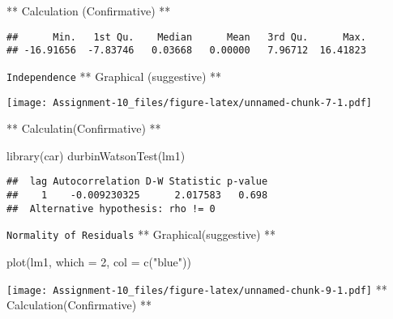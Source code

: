 \documentclass[
]{article}
\newenvironment{Shaded}{\begin{snugshade}}{\end{snugshade}}
\newcommand{\AttributeTok}[1]{\textcolor[rgb]{0.77,0.63,0.00}{#1}}
\newcommand{\DecValTok}[1]{\textcolor[rgb]{0.00,0.00,0.81}{#1}}
\newcommand{\FunctionTok}[1]{\textcolor[rgb]{0.00,0.00,0.00}{#1}}
\newcommand{\NormalTok}[1]{#1}
\newcommand{\SpecialCharTok}[1]{\textcolor[rgb]{0.00,0.00,0.00}{#1}}
\newcommand{\StringTok}[1]{\textcolor[rgb]{0.31,0.60,0.02}{#1}}
\begin{document}
** Calculation (Confirmative) **

\begin{Shaded}
\end{Shaded}

\begin{verbatim}
##      Min.   1st Qu.    Median      Mean   3rd Qu.      Max. 
## -16.91656  -7.83746   0.03668   0.00000   7.96712  16.41823
\end{verbatim}

\texttt{Independence} ** Graphical (suggestive) **

\begin{Shaded}
\end{Shaded}

\texttt{[image: Assignment-10\_files/figure-latex/unnamed-chunk-7-1.pdf]}

** Calculatin(Confirmative) **

\begin{Shaded}
\begin{Highlighting}[]
\FunctionTok{library}\NormalTok{(car)}
\FunctionTok{durbinWatsonTest}\NormalTok{(lm1)}
\end{Highlighting}
\end{Shaded}

\begin{verbatim}
##  lag Autocorrelation D-W Statistic p-value
##    1    -0.009230325      2.017583   0.698
##  Alternative hypothesis: rho != 0
\end{verbatim}

\texttt{Normality\ of\ Residuals} ** Graphical(suggestive) **

\begin{Shaded}
\begin{Highlighting}[]
\FunctionTok{plot}\NormalTok{(lm1, }\AttributeTok{which =} \DecValTok{2}\NormalTok{, }\AttributeTok{col =} \FunctionTok{c}\NormalTok{(}\StringTok{"blue"}\NormalTok{))}
\end{Highlighting}
\end{Shaded}

\texttt{[image: Assignment-10\_files/figure-latex/unnamed-chunk-9-1.pdf]}
** Calculation(Confirmative) **
\end{document}
